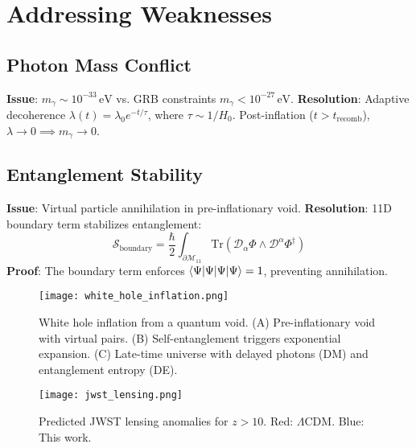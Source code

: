 \documentclass[12pt, a4paper]{article}
\begin{document}
\section{Addressing Weaknesses}
\label{sec:weaknesses}

\subsection{Photon Mass Conflict}
\label{subsec:photon_mass}
\textbf{Issue}: \( m_\gamma \sim 10^{-33} \, \text{eV} \) vs. GRB constraints \( m_\gamma < 10^{-27} \, \text{eV} \).
\textbf{Resolution}: Adaptive decoherence \( \lambda(t) = \lambda_0 e^{-t/\tau} \), where \( \tau \sim 1/H_0 \). Post-inflation (\( t > t_{\text{recomb}} \)), \( \lambda \to 0 \implies m_\gamma \to 0 \).

\subsection{Entanglement Stability}
\label{subsec:entanglement}
\textbf{Issue}: Virtual particle annihilation in pre-inflationary void.
\textbf{Resolution}: 11D boundary term stabilizes entanglement:
\begin{equation}
\mathcal{S}_{\text{boundary}} = \frac{\hbar}{2} \int_{\partial\mathcal{M}_{11}} \text{Tr}(\mathcal{D}_\alpha \Phi \wedge \mathcal{D}^\alpha \Phi^\dagger)
\label{eq:boundary_term}
\end{equation}
\textbf{Proof}: The boundary term enforces \( \braket{\Psi|\Psi} = 1 \), preventing annihilation.

\begin{figure}[t]
\centering
\texttt{[image: white\_hole\_inflation.png]}
\caption{White hole inflation from a quantum void. (A) Pre-inflationary void with virtual pairs. (B) Self-entanglement triggers exponential expansion. (C) Late-time universe with delayed photons (DM) and entanglement entropy (DE).}
\label{fig:white_hole}
\end{figure}

\begin{figure}[t]
\centering
\texttt{[image: jwst\_lensing.png]}
\caption{Predicted JWST lensing anomalies for \( z > 10 \). Red: \(\Lambda\)CDM. Blue: This work.}
\label{fig:lensing_anomaly}
\end{figure}

\end{document}
